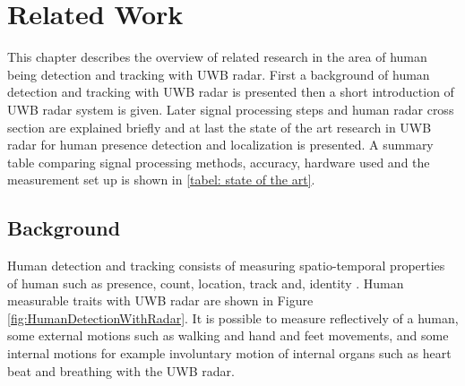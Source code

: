 \chapter{Related Work} 
This chapter describes the overview of related research in the area of human being detection and tracking with UWB radar. First a background of human detection and tracking with UWB radar is presented then a short introduction of UWB radar system is given. Later signal processing steps and human radar cross section are explained briefly and at last the state of the art research in UWB radar for human presence detection and localization is presented. A summary table comparing signal processing methods, accuracy, hardware used and the measurement set up is shown in \ref{tabel: state of the art}.
\section{Background}
Human detection and tracking consists of measuring spatio-temporal properties of human such as presence, count, location, track and, identity \cite{Teixeira2010}. 
Human measurable traits with UWB radar are shown in Figure \ref{fig:HumanDetectionWithRadar}. It is possible to measure reflectively of a human, some external motions such as walking and hand and feet movements, and some internal motions for example involuntary motion of internal organs such as heart beat and breathing with the UWB radar.

